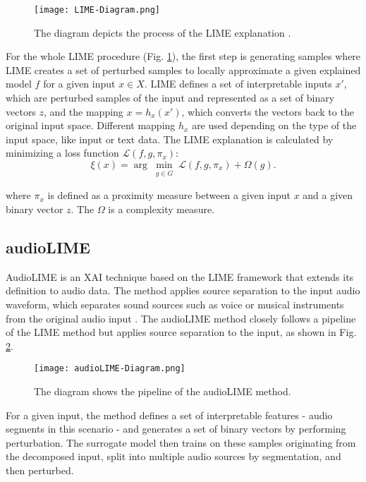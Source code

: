 \documentclass[
    bindingoffset=5mm,  %
    footnoteindent=3mm, %
    hyphenation=true    %
]{src/wut-thesis}
\begin{document}
\begin{figure}[h!] %
    \centering
    \texttt{[image: LIME-Diagram.png]}
    \caption{The diagram depicts the process of the LIME explanation \cite{Knab2025-pz}.}
    \label{fig:LimeSteps}
\end{figure}

For the whole LIME procedure (Fig. \ref{fig:LimeSteps}), the first step is generating samples
where LIME creates a set of perturbed samples to locally approximate a
given explained model $f$ for a given input $x \in X$.
LIME defines a set of interpretable inputs $x'$, which are perturbed samples of the input
and represented as a set of binary vectors $z$, and the mapping $x =h_x(x')$, which converts
the vectors back to the original input space. Different mapping $h_x$ are used depending
on the type of the input space, like input or text data.
The LIME explanation is calculated by minimizing a loss function $\mathcal{L}(f,g,\pi_x)$:
\begin{equation}
\xi(x) = \arg\min_{\substack{g \in G}} \mathcal{L}(f, g, \pi_{x}) + \Omega(g).
\end{equation}

where $\pi_x$ is defined as a proximity measure between a given input $x$ and a given
binary vector $z$. The $\Omega$ is a complexity measure.

\subsection{audioLIME} \label{ch2:audioLIME}
AudioLIME is an XAI technique based on the LIME framework that extends its definition to audio data.
The method applies source separation to the input audio waveform, which separates sound sources such
as voice or musical instruments from the original audio input \cite{Haunschmid2020-dd}.
The audioLIME method closely follows a pipeline of the LIME method but applies source
separation to the input, as shown in Fig. \ref{fig:audioLIME-Diagram}.

\begin{figure}[h!] %
    \centering
    \texttt{[image: audioLIME-Diagram.png]}
    \caption{The diagram shows the pipeline of the audioLIME method.}
    \label{fig:audioLIME-Diagram}
\end{figure}

For a given input, the method defines a set of interpretable features - audio segments in this scenario - and
generates a set of binary vectors by performing perturbation. The surrogate model then trains on these
samples originating from the decomposed input, split into multiple audio sources by segmentation,
and then perturbed.
\end{document}
